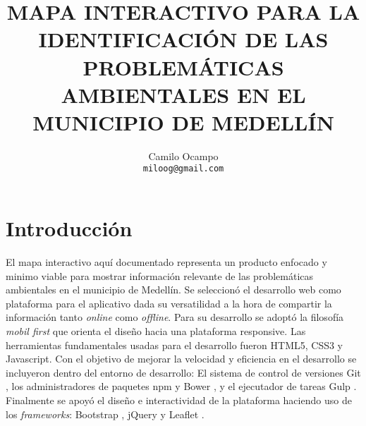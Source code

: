\documentclass[11pt,letterpaper]{article}
\author
{
	Camilo Ocampo\\
 	{\tt miloog@gmail.com}
}
\title{\bf MAPA INTERACTIVO PARA LA IDENTIFICACIÓN DE LAS PROBLEMÁTICAS AMBIENTALES EN EL MUNICIPIO DE MEDELLÍN}
\date{}
\begin{document}
\maketitle
\section{Introducción}
El mapa interactivo aquí documentado representa un producto enfocado y minimo viable para mostrar información relevante de las problemáticas ambientales en el municipio de Medellín. Se seleccionó el desarrollo web como plataforma para el aplicativo dada su versatilidad a la hora de compartir la información tanto {\it online} como {\it offline}. Para su desarrollo se adoptó la filosofía {\it mobil first} que orienta el diseño hacia una plataforma responsive. Las herramientas fundamentales usadas para el desarrollo fueron HTML5, CSS3 y Javascript. Con el objetivo de mejorar la velocidad y eficiencia en el desarrollo se incluyeron dentro del entorno de desarrollo: El sistema de control de versiones Git \cite{git}, los administradores de paquetes npm \cite{npm} y Bower \cite{bower}, y el ejecutador de tareas Gulp \cite{gulp}. Finalmente se apoyó el diseño e interactividad de la plataforma haciendo uso de los {\it frameworks}: Bootstrap \cite{bootstrap}, jQuery y Leaflet \cite{leaflet}.



\end{document}
